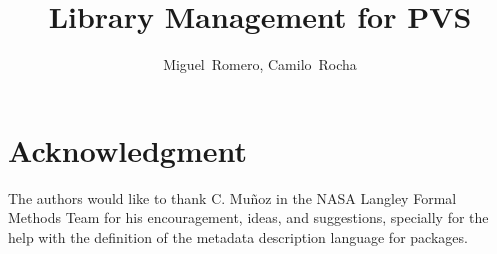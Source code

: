 \documentclass[journal,comsoc]{IEEEtran}
\begin{document}
\title{Library Management for PVS}

\author{Miguel~Romero,
        Camilo~Rocha}

\maketitle



\begin{IEEEkeywords}
\end{IEEEkeywords}

\IEEEpeerreviewmaketitle











\section*{Acknowledgment}
The authors would like to thank
C. Mu\~noz in the NASA Langley Formal Methods Team for his
encouragement, ideas, and suggestions, specially for the help with the
definition of the metadata description language for packages.

\ifCLASSOPTIONcaptionsoff
  \newpage
\fi



\end{document}
